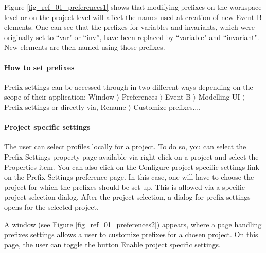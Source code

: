 Figure \ref{fig_ref_01_preferences1} shows that modifying prefixes on the workspace level or on the project level will affect the names used at creation of new Event-B elements. One can see that the prefixes for variables and invariants, which were originally set to ``var" or ``inv'', have been replaced by ``variable" and ``invariant". New elements are then named using those prefixes.



\paragraph{How to set prefixes}

Prefix settings can be accessed through in two different ways depending on the scope of their application: \textsf{Window $\rangle$ Preferences $\rangle$ Event-B $\rangle$ Modelling UI $\rangle$ Prefix settings} or directly via, \textsf{Rename $\rangle$ Customize prefixes...}.

\paragraph{Project specific settings}

The user can select profiles locally for a project. To do so, you can select the \textsf{Prefix Settings} property page available via right-click on a project and select the \textsf{Properties} item. You can also click on the \textsf{Configure project specific settings} link on the \textsf{Prefix Settings} preference page. In this case, one will have to choose the project for which the prefixes should be set up. This is allowed via a specific project selection dialog. After the project selection, a dialog for prefix settings opens for the selected project. 

A window (see Figure \ref{fig_ref_01_preferences2}) appears, where a page handling prefixes settings allows a user to customize prefixes for a chosen project. On this page, the user can toggle the button \textsf{Enable project specific settings}.


